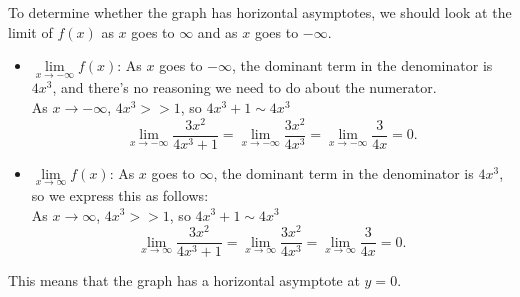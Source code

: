 \documentclass{article}
\begin{document}
\begin{enumerate}
  \begin{solution}
    To determine whether the graph has horizontal asymptotes, we should look at the limit of $f(x)$ as $x$
    goes to $\infty$ and as $x$ goes to $-\infty$.

    \begin{itemize}
      \item $\lim\limits_{x \to -\infty} f(x)$: As $x$ goes to $-\infty$, the dominant term in the 
      denominator is $4x^3$, and there's no reasoning we need to do about the numerator. \\
      As $x\to -\infty$, $4x^3>>1$, so $4x^3+1 \sim 4x^3$ 
      \[
        \lim_{x \to -\infty} \frac{3x^2}{4x^3+1} = \lim_{x \to -\infty} \frac{3x^2}{4x^3} = 
        \lim_{x \to -\infty} \frac{3}{4x} = 0.
      \]
      \item $\lim\limits_{x \to \infty} f(x)$: As $x$ goes to $\infty$, the dominant term in the 
      denominator is $4x^3$, so we express this as follows: \\
      As $x\to \infty$, $4x^3>>1$, so $4x^3+1 \sim 4x^3$ 
      \[
        \lim_{x \to \infty} \frac{3x^2}{4x^3+1} = \lim_{x \to \infty} \frac{3x^2}{4x^3} = 
        \lim_{x \to \infty} \frac{3}{4x} = 0.
      \]
    \end{itemize}
    This means that the graph has a horizontal asymptote at $y=0$. 
  \end{solution}


\end{enumerate}
\end{document}
